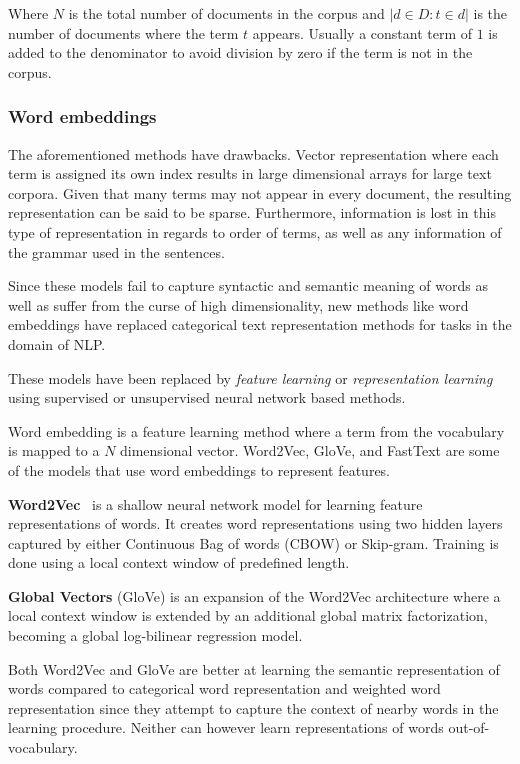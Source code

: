 \documentclass[oneside, english, bibtex]{kththesis}
\begin{document}
Where $N$ is the total number of documents in the corpus and $|d \in D : t \in d|$ is the number of documents where the term $t$ appears. Usually a constant term of $1$ is added to the denominator to avoid division by zero if the term is not in the corpus.

\subsubsection{Word embeddings}

The aforementioned methods have drawbacks. Vector representation where each term is assigned its own index results in large dimensional arrays for large text corpora. Given that many terms may not appear in every document, the resulting representation can be said to be sparse. Furthermore, information is lost in this type of representation in regards to order of terms, as well as any information of the grammar used in the sentences.

Since these models fail to capture syntactic and semantic meaning of words as well as suffer from the curse of high dimensionality, new methods like word embeddings have replaced categorical text representation methods for tasks in the domain of NLP.

These models have been replaced by \textit{feature learning} or \textit{representation learning} using supervised or unsupervised neural network based methods.

Word embedding is a feature learning method where a term from the vocabulary is mapped to a $N$ dimensional vector. Word2Vec, GloVe, and FastText are some of the models that use word embeddings to represent features.

\textbf{Word2Vec}~\cite{mikolov2013} is a shallow neural network model for learning feature representations of words. It creates word representations using two hidden layers captured by either Continuous Bag of words (CBOW) or Skip-gram. Training is done using a local context window of predefined length. 

\textbf{Global Vectors}\cite{pennington2014glove} (GloVe) is an expansion of the Word2Vec architecture where a local context window is extended by an additional global matrix factorization, becoming a global log-bilinear regression model.

Both Word2Vec and GloVe are better at learning the semantic representation of words compared to categorical word representation and weighted word representation since they attempt to capture the context of nearby words in the learning procedure. Neither can however learn representations of words out-of-vocabulary. 
\end{document}
